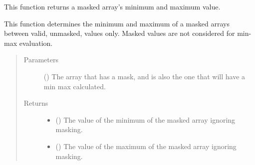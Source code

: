 \documentclass[letterpaper,10pt,english]{sphinxmanual}
\begin{document}

\begin{fulllineitems}
\label{\detokenize{python_docstrings/IfA_Smeargle.meta.fits_and_arrays:IfA_Smeargle.meta.fits_and_arrays.smeargle_masked_array_min_max}}
This function returns a masked array’s minimum and maximum value.

This function determines the minimum and maximum of a masked arrays
between valid, unmasked, values only. Masked values are not considered
for min-max evaluation.
\begin{quote}\begin{description}
\item[{Parameters}] \leavevmode
{} () \textendash{} The array that has a mask, and is also the one that will have a
min max calculated.

\item[{Returns}] \leavevmode
\begin{itemize}
\item {} 
 () \textendash{} The value of the minimum of the masked array ignoring masking.

\item {} 
 () \textendash{} The value of the maximum of the masked array ignoring masking.

\end{itemize}


\end{description}\end{quote}

\end{fulllineitems}

\end{document}
